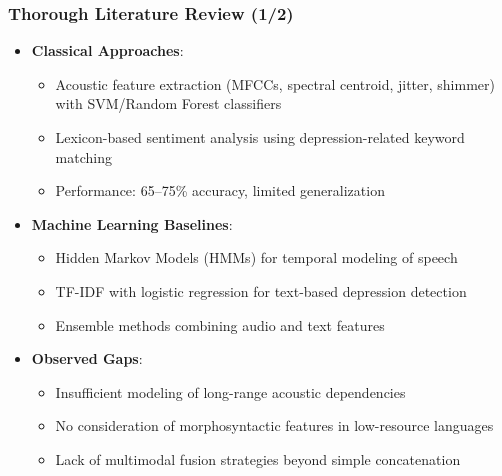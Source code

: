 \documentclass{beamer}
\begin{document}
\begin{frame}
\frametitle{Thorough Literature Review (1/2)}
\begin{itemize}
    \item \textbf{Classical Approaches}:
    \begin{itemize}
        \item Acoustic feature extraction (MFCCs, spectral centroid, jitter, shimmer) with SVM/Random Forest classifiers
        \item Lexicon-based sentiment analysis using depression-related keyword matching
        \item Performance: 65--75\% accuracy, limited generalization
    \end{itemize}
    \item \textbf{Machine Learning Baselines}:
    \begin{itemize}
        \item Hidden Markov Models (HMMs) for temporal modeling of speech
        \item TF-IDF with logistic regression for text-based depression detection
        \item Ensemble methods combining audio and text features
    \end{itemize}
    \item \textbf{Observed Gaps}:
    \begin{itemize}
        \item Insufficient modeling of long-range acoustic dependencies
        \item No consideration of morphosyntactic features in low-resource languages
        \item Lack of multimodal fusion strategies beyond simple concatenation
    \end{itemize}
\end{itemize}
\end{frame}
\end{document}
